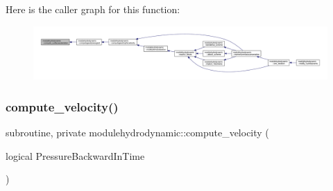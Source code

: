 Here is the caller graph for this function\+:\nopagebreak
\begin{figure}[H]
\begin{center}
\leavevmode
\includegraphics[width=350pt]{namespacemodulehydrodynamic_a6ed1d015329405f39d5cfdf5e7481273_icgraph}
\end{center}
\end{figure}
\mbox{\label{namespacemodulehydrodynamic_aba4d9045d33fdc1b7b6011fd3fbb9c28}} 
\subsubsection{\texorpdfstring{compute\+\_\+velocity()}{compute\_velocity()}}
{\footnotesize\ttfamily subroutine, private modulehydrodynamic\+::compute\+\_\+velocity (\begin{DoxyParamCaption}\item[{logical}]{Pressure\+Backward\+In\+Time }\end{DoxyParamCaption})\hspace{0.3cm}{\ttfamily [private]}}

